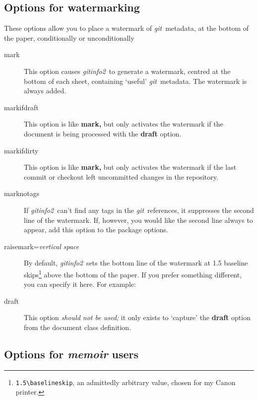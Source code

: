 \documentclass[a4paper,12pt,twoside,openany]{memoir}
\newcommand{\sfit}[1]{\textit{#1}}
\newcommand{\git}{\sfit{git}}
\newcommand{\tpname}{\sfit{gitinfo2}}
\begin{document}
\subsection{Options for watermarking}

These options allow you to place a watermark of \git\ metadata,
at the bottom of the paper, conditionally or unconditionally

\begin{description}

\item[mark]
This option causes \tpname\ to generate a watermark,
centred at the bottom of each sheet,
containing `useful' \git\ metadata.
The watermark is always added.

\item[markifdraft]
This option is like {\ttfamily\bfseries mark,}
but only activates the watermark if the document is being processed
with the {\ttfamily\bfseries draft} option.

\item[markifdirty]
This option is like {\ttfamily\bfseries mark,}
but only activates the watermark if the last commit or checkout left
uncommitted changes in the repository.

\item[marknotags]
If \tpname\ can't find any tags in the \git\ references,
it suppresses the second line of the watermark.
If, however, you would like the second line always to appear,
add this option to the package options.

\item[raisemark=\textit{vertical space}]
By default, \tpname\ sets the bottom line of the watermark
at 1.5 baseline
skips\footnote{\texttt{1.5\textbackslash{}baselineskip},
an admittedly arbitrary value, chosen for my Canon printer.}
above the bottom of the paper.
If you prefer something different,
you can specify it here.
For example:

\begin{quote}
{\ttfamily
[raisemark=0.95\textbackslash{}paperheight]
}
\end{quote}


\item[draft]
This option \emph{should not be used;} it only exists to `capture' the
{\ttfamily\bfseries draft} option from the document class definition.

\end{description}

\subsection{Options for \sfit{memoir} users}
\end{document}
